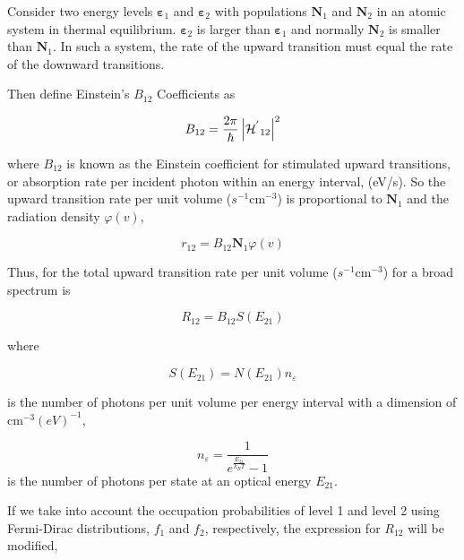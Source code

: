 Consider two energy levels \(\mathbf{\varepsilon}_{1}\) and
\(\mathbf{\varepsilon}_{2}\) with populations \(\mathbf{N}_{1}\) and
\(\mathbf{N}_{2}\) in an atomic system in thermal equilibrium.
\(\mathbf{\varepsilon}_{2}\) is larger than \(\mathbf{\varepsilon}_{1}\) and
normally \(\mathbf{N}_{2}\) is smaller than \(\mathbf{N}_{1}\). In such a
system, the rate of the upward transition must equal the rate of the downward
transitions.

Then define Einstein's \(B_{12}\) Coefficients as

\begin{equation}
  B_{12} = \frac{2\pi}{\hbar}\left| {\mathcal{H}^{'}}_{12} \right|^{2}
\end{equation}

where \(B_{12}\) is known as the Einstein coefficient for stimulated
upward transitions, or absorption rate per incident photon within an
energy interval, (eV/s). So the upward transition rate per unit volume
(\(s^{- 1}\text{cm}^{- 3}\)) is proportional to \(\mathbf{N}_{1}\) and
the radiation density \(\varphi\left( v \right)\),

\begin{equation}
  r_{12}{= B}_{12}\mathbf{N}_{1}\varphi\left( v \right)
\end{equation}

Thus, for the total upward transition rate per unit volume
(\(s^{- 1}\text{cm}^{- 3}\)) for a broad spectrum is

\begin{equation}
  R_{12}{= B}_{12}S(E_{21})
\end{equation}

where

\begin{equation}
  S\left( E_{21} \right) = N\left( E_{21} \right)n_{\varepsilon}
\end{equation}

is the number of photons per unit volume per energy interval with a
dimension of \(\text{cm}^{- 3}{(eV)}^{- 1}\),

\begin{equation}
  n_{\varepsilon} = \frac{1}{e^{\frac{E_{21}}{k_{B}T}} - 1}
\end{equation}
is the number of photons per state at an optical energy \(E_{21} \).

If we take into account the occupation probabilities of level 1 and
level 2 using Fermi-Dirac distributions, \(f_{1}\) and \(f_{2}\),
respectively, the expression for \(R_{12}\) will be modified,

